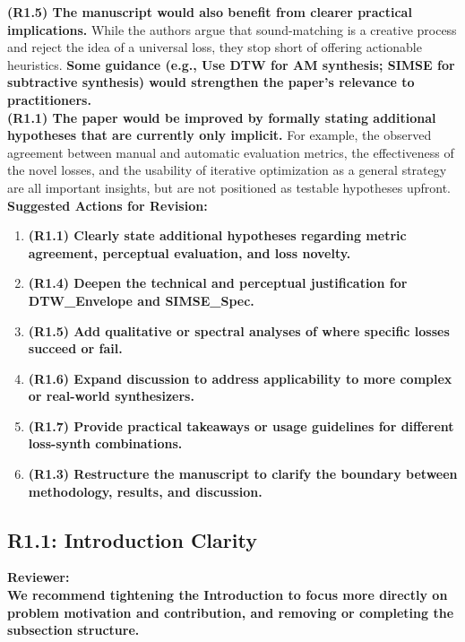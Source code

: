 \documentclass[11pt]{article}
\begin{document}
\textbf{(R1.5) The manuscript would also benefit from clearer practical implications.} While the authors argue that sound-matching is a creative process and reject the idea of a universal loss, they stop short of offering actionable heuristics. \textbf{Some guidance (e.g., Use DTW for AM synthesis; SIMSE for subtractive synthesis) would strengthen the paper’s relevance to practitioners.} \\
\textbf{(R1.1) The paper would be improved by formally stating additional hypotheses that are currently only implicit.} For example, the observed agreement between manual and automatic evaluation metrics, the effectiveness of the novel losses, and the usability of iterative optimization as a general strategy are all important insights, but are not positioned as testable hypotheses upfront. \\
\textbf{Suggested Actions for Revision:}
\begin{enumerate}
  \item \textbf{(R1.1) Clearly state additional hypotheses regarding metric agreement, perceptual evaluation, and loss novelty.}
  \item \textbf{(R1.4) Deepen the technical and perceptual justification for DTW\_Envelope and SIMSE\_Spec.}
  \item \textbf{(R1.5) Add qualitative or spectral analyses of where specific losses succeed or fail.}
  \item \textbf{(R1.6) Expand discussion to address applicability to more complex or real-world synthesizers.}
  \item \textbf{(R1.7) Provide practical takeaways or usage guidelines for different loss-synth combinations.}
  \item \textbf{(R1.3) Restructure the manuscript to clarify the boundary between methodology, results, and discussion.}
\end{enumerate}

\subsection*{R1.1: Introduction Clarity}
\label{R1.1}
\noindent\textbf{Reviewer:}\\
\textbf{We recommend tightening the Introduction to focus more directly on problem motivation and contribution, and removing or completing the subsection structure.
\\}
\end{document}
